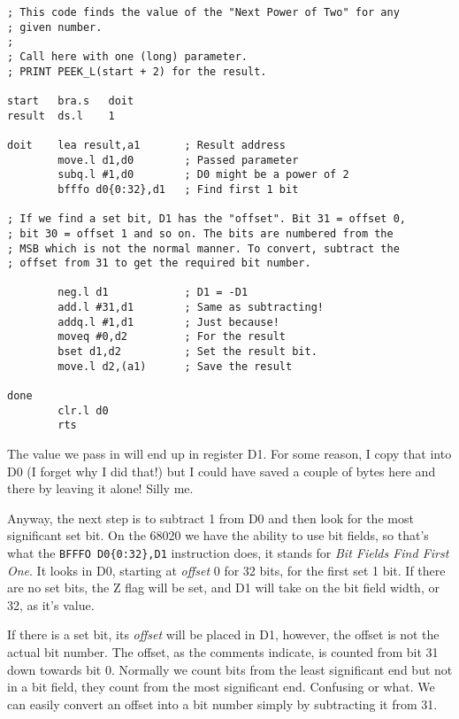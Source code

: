 \begin{lstlisting}[caption={MC60020 - Power2\_asm},label={lis:MC60020-Power2},breaklines=true,showstringspaces=false,tabsize=4]
; This code finds the value of the "Next Power of Two" for any
; given number. 
;
; Call here with one (long) parameter.
; PRINT PEEK_L(start + 2) for the result.

start   bra.s   doit
result  ds.l    1

doit    lea result,a1       ; Result address
        move.l d1,d0        ; Passed parameter
        subq.l #1,d0        ; D0 might be a power of 2
        bfffo d0{0:32},d1   ; Find first 1 bit

; If we find a set bit, D1 has the "offset". Bit 31 = offset 0,
; bit 30 = offset 1 and so on. The bits are numbered from the
; MSB which is not the normal manner. To convert, subtract the
; offset from 31 to get the required bit number.

        neg.l d1            ; D1 = -D1
        add.l #31,d1        ; Same as subtracting!
        addq.l #1,d1        ; Just because!
        moveq #0,d2         ; For the result
        bset d1,d2          ; Set the result bit.
        move.l d2,(a1)      ; Save the result

done
        clr.l d0
        rts
\end{lstlisting}

The value we pass in will end up in register D1. For some reason,
I copy that into D0 (I forget why I did that!) but I could have saved
a couple of bytes here and there by leaving it alone! Silly me.

Anyway, the next step is to subtract 1 from D0 and then look for the
most significant set bit. On the 68020 we have the ability to use
bit fields, so that's what the \lstinline[basicstyle={\ttfamily}]!BFFFO D0{0:32},D1!
instruction does, it stands for \emph{Bit Fields Find First One}.
It looks in D0, starting at \emph{offset} 0 for 32 bits, for the first
set 1 bit. If there are no set bits, the Z flag will be set, and D1
will take on the bit field width, or 32, as it's value. 

If there is a set bit, its \emph{offset} will be placed in D1, however,
the offset is not the actual bit number. The offset, as the comments
indicate, is counted from bit 31 down towards bit 0. Normally we count
bits from the least significant end but not in a bit field, they count
from the most significant end. Confusing or what. We can easily convert
an offset into a bit number simply by subtracting it from 31.

